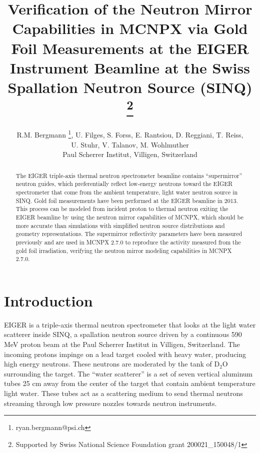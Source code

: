 \documentclass[a4paper,
              ]{jacow}
\begin{document}
\title{Verification of the Neutron Mirror Capabilities in MCNPX via Gold Foil Measurements at the EIGER Instrument Beamline at the Swiss Spallation Neutron Source (SINQ) \thanks{Supported by Swiss National Science Foundation grant 200021\_150048/1} }

\author{R.M. Bergmann \thanks{ryan.bergmann@psi.ch}, U. Filges, S. Forss, E. Rantsiou, D. Reggiani, T. Reiss, \\ U. Stuhr, V. Talanov, M. Wohlmuther \\ Paul Scherrer Institut, Villigen, Switzerland}

\maketitle

%
\begin{abstract}
   The EIGER triple-axis thermal neutron spectrometer beamline contains ``supermirror'' neutron guides, which preferentially reflect low-energy neutrons toward the EIGER spectrometer that come from the ambient temperature, light water neutron source in SINQ.  Gold foil measurements have been performed at the EIGER beamline in 2013.  This process can be modeled from incident proton to thermal neutron exiting the EIGER beamline by using the neutron mirror capabilities of MCNPX, which should be more accurate than simulations with simplified neutron source distributions and geometry representations.  The supermirror reflectivity parameters have been measured previously and are used in MCNPX 2.7.0 to reproduce the activity measured from the gold foil irradiation, verifying the neutron mirror modeling capabilities in MCNPX 2.7.0.
\end{abstract}


\section{Introduction}

EIGER is a triple-axis thermal neutron spectrometer that looks at the light water scatterer inside SINQ, a spallation neutron source driven by a continuous 590 MeV proton beam at the Paul Scherrer Institut in Villigen, Switzerland.  The incoming protons impinge on a lead target cooled with heavy water, producing high energy neutrons.  These neutrons are moderated by the tank of D$_2$O surrounding the target.  The ``water scatterer'' is a set of seven vertical aluminum tubes 25 cm away from the center of the target that contain ambient temperature light water.  These tubes act as a scattering medium to send thermal neutrons streaming through low pressure nozzles towards neutron instruments.  
\end{document}
